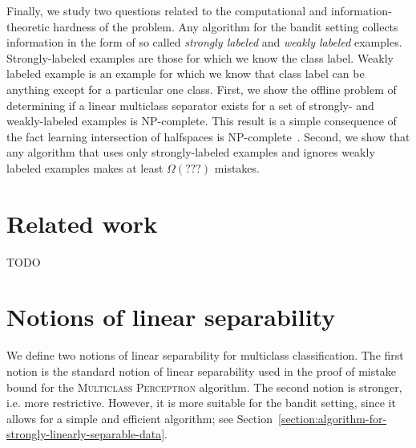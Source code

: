 \documentclass[12pt]{article}
\begin{document}
Finally, we study two questions related to the computational and
information-theoretic hardness of the problem. Any algorithm for the bandit
setting collects information in the form of so called \emph{strongly labeled}
and \emph{weakly labeled} examples. Strongly-labeled examples are those for
which we know the class label. Weakly labeled example is an example for which we
know that class label can be anything except for a particular one class. First,
we show the offline problem of determining if a linear multiclass separator
exists for a set of strongly- and weakly-labeled examples is NP-complete. This
result is a simple consequence of the fact learning intersection of halfspaces
is NP-complete~\citep{Blum-Rivest-1993}. Second, we show that any algorithm that
uses only strongly-labeled examples and ignores weakly labeled examples makes at
least $\Omega(???)$ mistakes.


\section{Related work}
\label{section:related-work}

TODO


\section{Notions of linear separability}
\label{section:notions-of-linear-separability}

We define two notions of linear separability for multiclass classification. The
first notion is the standard notion of linear separability used in the proof of
mistake bound for the \textsc{Multiclass Perceptron} algorithm. The second
notion is stronger, i.e. more restrictive. However, it is more suitable for the
bandit setting, since it allows for a simple and efficient algorithm; see
Section~\ref{section:algorithm-for-strongly-linearly-separable-data}.
\end{document}
